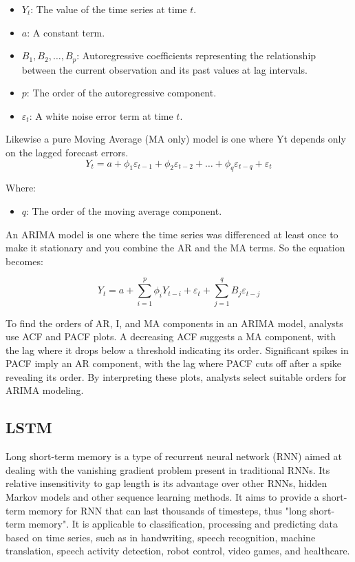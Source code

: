 \documentclass{ieeeojies}
\begin{document}
\begin{itemize}
    \item $Y_t$: The value of the time series at time $t$.
    \item $a$: A constant term.
    \item $B_1, B_2, \ldots, B_p$: Autoregressive coefficients representing the relationship between the current observation and its past values at lag intervals.
    \item $p$: The order of the autoregressive component.
    \item $\varepsilon_t$: A white noise error term at time $t$.
\end{itemize}
Likewise a pure Moving Average (MA only) model is one where Yt depends only on the lagged forecast errors.
\begin{equation*}
Y_t = a + \phi_1 \varepsilon_{t-1} + \phi_2 \varepsilon_{t-2} + \ldots + \phi_q \varepsilon_{t-q} + \varepsilon_t
\end{equation*}

Where:

\begin{itemize}
    \item $q$: The order of the moving average component.
\end{itemize}

An ARIMA model is one where the time series was differenced at least once to make it stationary and you combine the AR and the MA terms. So the equation becomes:

\begin{equation*}
Y_t = a + \sum_{i=1}^{p} \phi_i Y_{t-i} + \varepsilon_t + \sum_{j=1}^{q} B_j \varepsilon_{t-j}
\end{equation*}

To find the orders of AR, I, and MA components in an ARIMA model, analysts use ACF and PACF plots. A decreasing ACF suggests a MA component, with the lag where it drops below a threshold indicating its order. Significant spikes in PACF imply an AR component, with the lag where PACF cuts off after a spike revealing its order. By interpreting these plots, analysts select suitable orders for ARIMA modeling.

\subsection{LSTM}
Long short-term memory is a type of recurrent neural network (RNN) aimed at dealing with the vanishing gradient problem present in traditional RNNs. Its relative insensitivity to gap length is its advantage over other RNNs, hidden Markov models and other sequence learning methods. It aims to provide a short-term memory for RNN that can last thousands of timesteps, thus "long short-term memory". It is applicable to classification, processing and predicting data based on time series, such as in handwriting, speech recognition, machine translation, speech activity detection, robot control, video games, and healthcare.
\end{document}
